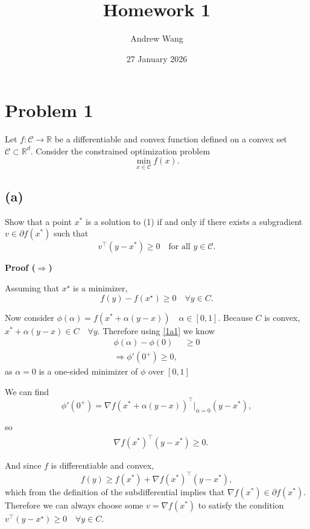 \documentclass[11pt]{article}
\title{Homework 1}
\author{Andrew Wang}
\date{27 January 2026}
\begin{document}
\maketitle

\section*{Problem 1}

Let $f : \mathcal{C} \to \mathbb{R}$ be a differentiable and convex function defined on a convex set $\mathcal{C} \subset \mathbb{R}^d$. Consider the constrained optimization problem
\begin{equation}
\min_{x \in \mathcal{C}} f(x).
\end{equation}

\subsection*{(a)}

Show that a point $x^*$ is a solution to (1) if and only if there exists a subgradient
$v \in \partial f(x^*)$ such that
\[
v^\top (y - x^*) \ge 0 \quad \text{for all } y \in \mathcal{C}.
\]

\hrulefill

\textbf{Proof ($\Rightarrow$)}

Assuming that $x^\star$ is a minimizer,
\begin{equation}\label{1a1}
    f(y) - f(x^\star) \ge 0 \quad \forall y \in C.
\end{equation}

Now consider $\phi(\alpha) = f(x^* + \alpha(y-x)) \quad \alpha \in [0,1]$. Because $C$ is convex, $x^* + \alpha(y-x) \in C \quad \forall y$. Therefore using \ref{1a1} we know
\begin{align*}
    \phi(\alpha) - \phi(0) &\geq 0 \\
    \Rightarrow \phi'(0^+) \geq 0,
\end{align*}
as $\alpha = 0$ is a one-sided minimizer of $\phi$ over $[0,1]$

We can find
\[
\phi'(0^+) = \nabla f(x^* + \alpha(y-x))^\top |_{\alpha=0} (y-x^*),
\]

so
\begin{align*}
    \quad \nabla f(x^*)^\top (y-x^*) \geq 0.
\end{align*}

And since $f$ is differentiable and convex,
\[
f(y) \geq f(x^*) + \nabla f(x^*)^\top (y - x^*),
\]
which from the definition of the subdifferential implies that $\nabla f(x^*) \in \partial f(x^*)$. Therefore we can always choose some $v = \nabla f(x^*)$ to satisfy the condition $v^\top (y - x^\star) \ge 0 \quad \forall y \in C.$
\end{document}
